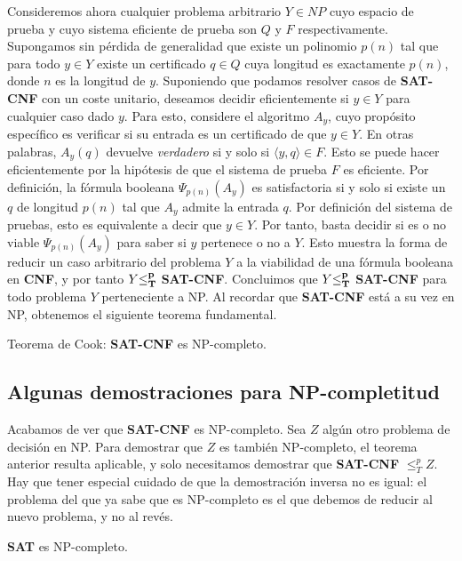 Consideremos ahora cualquier problema arbitrario $Y \in NP$ cuyo espacio de prueba y cuyo sistema eficiente de prueba son $Q$ y $F$ respectivamente. Supongamos sin pérdida de generalidad que existe un polinomio $p(n)$ tal que para todo $y \in Y$ existe un certificado $q \in Q$ cuya longitud es exactamente $p(n)$, donde $n$ es la longitud de $y$. Suponiendo que podamos resolver casos de \textbf{SAT-CNF} con un coste unitario, deseamos decidir eficientemente si $y \in Y$ para cualquier caso dado $y$. Para esto, considere el algoritmo $A_y$, cuyo propósito específico es verificar si su entrada es un certificado de que $y \in Y$. En otras palabras, $A_y (q)$ devuelve \emph{verdadero} si y solo si $\langle y, q \rangle \in F$. Esto se puede hacer eficientemente por la hipótesis de que el sistema de prueba $F$ es eficiente. Por definición, la fórmula booleana $\Psi_{p(n)}(A_y)$ es satisfactoria si y solo si existe un $q$ de longitud $p(n)$ tal que $A_y$ admite la entrada $q$. Por definición del sistema de pruebas, esto es equivalente a decir que $y \in Y$. Por tanto, basta decidir si es o no viable $\Psi_{p(n)}(A_y)$ para saber si $y$ pertenece o no a $Y$. Esto muestra la forma de reducir un caso arbitrario del problema $Y$ a la viabilidad de una fórmula booleana en \textbf{CNF}, y por tanto $Y \bf{\leq} _{T}^p$ \textbf{SAT-CNF}. Concluimos que $Y \bf{\leq} _{T}^p$ \textbf{SAT-CNF} para todo problema $Y$ perteneciente a NP. Al recordar que \textbf{SAT-CNF} está a su vez en NP, obtenemos el siguiente teorema fundamental.

\begin{fondo}
Teorema de Cook: \textbf{SAT-CNF} es NP-completo.
\end{fondo}

\subsection{Algunas demostraciones para NP-completitud}

Acabamos de ver que \textbf{SAT-CNF} es NP-completo. Sea $Z$ algún otro problema de decisión en NP. Para demostrar que $Z$ es también NP-completo, el teorema anterior resulta aplicable, y solo necesitamos demostrar que \textbf{SAT-CNF} $\leq _{T}^p Z$. Hay que tener especial cuidado de que la demostración inversa no es igual: el problema del que ya sabe que es NP-completo es el que debemos de reducir al nuevo problema, y no al revés.

\begin{fondo}
\textbf{SAT} es NP-completo.
\end{fondo}

